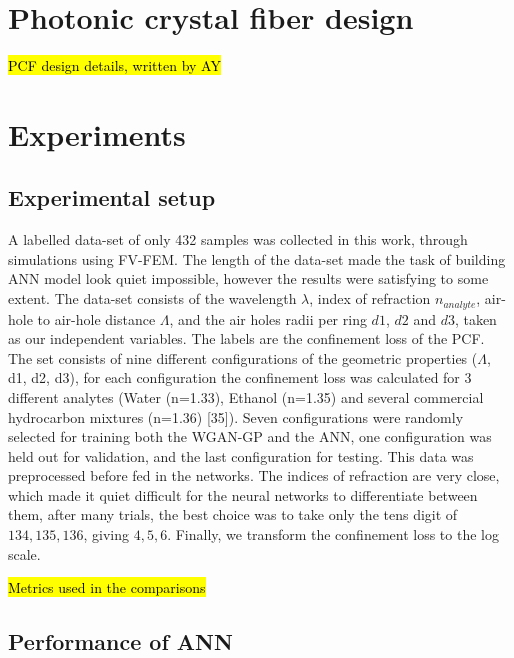 \documentclass[draft, a4, 10pt, onecolumn]{IEEEtran}
\begin{document}
\section{Photonic crystal fiber design}
\label{sec:pcf}

\hl{PCF design details, written by AY}

\section{Experiments}
\label{sec:exp}

\subsection{Experimental setup}

A labelled data-set of only 432 samples was collected in this work, through simulations using FV-FEM. The length of the data-set made the task of building ANN model look quiet impossible, however the results were satisfying to some extent. The data-set consists of the wavelength $\lambda$, index of refraction $n_{analyte} $, air-hole to air-hole distance $ \Lambda $, and the air holes radii per ring $d1$, $d2$ and $d3$, taken as our independent variables. The labels are the confinement loss of the PCF. The set consists of nine different configurations of the geometric properties ($ \Lambda $, d1, d2, d3), for each configuration the confinement loss was calculated for 3 different analytes (Water (n=1.33), Ethanol (n=1.35) and several commercial hydrocarbon mixtures (n=1.36) [35]). Seven configurations were randomly selected for training both the WGAN-GP and the ANN, one configuration was held out for validation, and the last configuration for testing. This data was preprocessed before fed in the networks. The indices of refraction  are very close, which made it quiet difficult for the neural networks to differentiate between them, after many trials, the best choice was to take only the tens digit of ${134, 135, 136}$, giving ${4, 5, 6}$. Finally, we transform the confinement loss to the log scale.

\hl{Metrics used in the comparisons}


\subsection{Performance of ANN}
\end{document}
